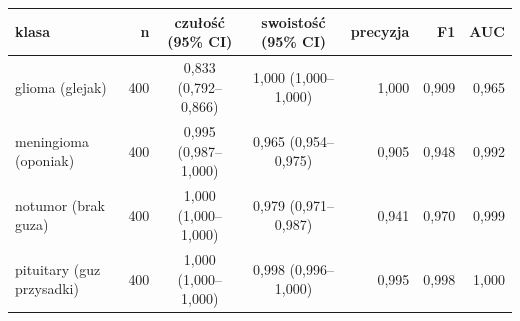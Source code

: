 \begin{tabular}{lrccrrr}
\toprule
klasa & n & czułość (95\% CI) & swoistość (95\% CI) & precyzja & F1 & AUC \\
\midrule
glioma (glejak) & 400 & 0,833 (0,792--0,866) & 1,000 (1,000--1,000) & 1,000 & 0,909 & 0,965 \\
meningioma (oponiak) & 400 & 0,995 (0,987--1,000) & 0,965 (0,954--0,975) & 0,905 & 0,948 & 0,992 \\
notumor (brak guza) & 400 & 1,000 (1,000--1,000) & 0,979 (0,971--0,987) & 0,941 & 0,970 & 0,999 \\
pituitary (guz przysadki) & 400 & 1,000 (1,000--1,000) & 0,998 (0,996--1,000) & 0,995 & 0,998 & 1,000 \\
\bottomrule
\end{tabular}
